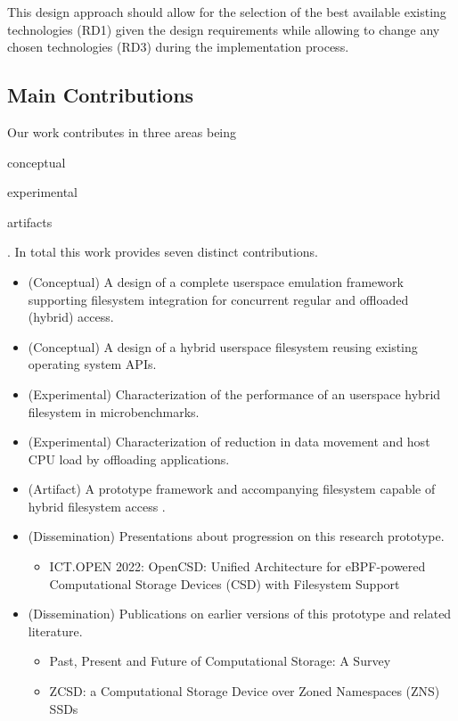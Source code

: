 This design approach should allow for the selection of the best available
existing technologies (RD1) given the design requirements while allowing to
change any chosen technologies (RD3) during the implementation process.

\subsection{Main Contributions}

Our work contributes in three areas being \begin{enumerate*} \item conceptual
\item experimental \item artifacts \end{enumerate*}. In total this work
provides seven distinct contributions.

\begin{itemize}
    \item (Conceptual) A design of a complete userspace emulation framework
    supporting filesystem integration for concurrent regular and offloaded
    (hybrid) access.
    \item (Conceptual) A design of a hybrid userspace filesystem reusing
    existing operating system APIs.
    \item (Experimental) Characterization of the performance of an userspace
    hybrid filesystem in microbenchmarks.
    \item (Experimental) Characterization of reduction in data movement and host
    CPU load by offloading applications.
    \item (Artifact) A prototype framework and accompanying filesystem capable
    of hybrid filesystem access \cite{qemu-csd}.
    \item (Dissemination) Presentations about progression on this research
        prototype.
        \begin{itemize}
            \item ICT.OPEN 2022: OpenCSD: Unified Architecture for eBPF-powered
                  Computational Storage Devices (CSD) with Filesystem Support
                  \cite{lukken2022ictopen}
        \end{itemize}
    \item (Dissemination) Publications on earlier versions of this prototype and
        related literature.
        \begin{itemize}
            \item Past, Present and Future of Computational Storage: A Survey \cite{lukken2021past}
            \item ZCSD: a Computational Storage Device over Zoned Namespaces (ZNS) SSDs \cite{lukken2021zcsd}
        \end{itemize}
\end{itemize}